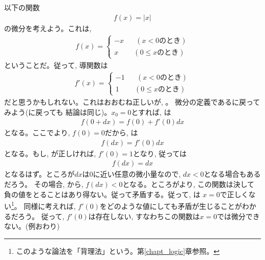 \begin{exmpl}\label{ex:Nodif_|x|} 以下の関数
\begin{eqnarray}f(x)=|x|\label{eq:f(x)=|x|}\end{eqnarray}
の微分を考えよう。これは, 
\begin{eqnarray*}
f(x)=\begin{cases}
-x\,\,\,\,\,\,\,\,\,\,(x<0\text{のとき})\\
x\,\,\,\,\,\,\,\,\,\,\,\,\,(0\leq x\text{のとき})
\end{cases}\end{eqnarray*}
ということだ。従って, 導関数は
\begin{eqnarray}
f'(x)=\begin{cases}
-1\,\,\,\,\,\,\,\,\,\,(x<0\text{のとき})\\
1\,\,\,\,\,\,\,\,\,\,\,\,\,(0\leq x\text{のとき})
\end{cases}\label{eq:|x|'2}\end{eqnarray}
だと思うかもしれない。これはおおむね正しいが, 。
微分の定義であるに戻ってみよう(に戻っても
結論は同じ)。$x_0=0$とすれば, は
\begin{eqnarray}f(0+dx) = f(0)+f'(0)dx\label{eq:|x|'3}\end{eqnarray}
となる。ここでより, $f(0)=0$だから, は
\begin{eqnarray}f(dx) = f'(0)dx\label{eq:|x|'4}\end{eqnarray}
となる。もし, が正しければ, $f'(0)=1$となり, 従っては
\begin{eqnarray}f(dx) = dx\label{eq:|x|'5}\end{eqnarray}
となるはず。ところが$dx$は0に近い任意の微小量なので, $dx<0$となる場合もあるだろう。
その場合, から, $f(dx)<0$となる。ところがより, 
この関数は決して負の値をとることはあり得ない。従って矛盾する。従って, は
$x=0$で正しくない\footnote{このような論法を「背理法」という。第\ref{chapt_logic}章参照。}。
同様に考えれば, $f'(0)$をどのような値にしても矛盾が生じることがわかるだろう。
従って, $f'(0)$は存在しない, すなわちこの関数は$x=0$では微分できない。(例おわり)
\end{exmpl}

